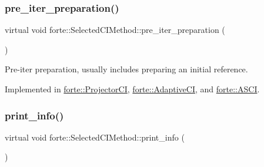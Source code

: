 \mbox{\label{classforte_1_1_selected_c_i_method_af92b210415034874fcf2faac8b00eca9}} 
\subsubsection{\texorpdfstring{pre\+\_\+iter\+\_\+preparation()}{pre\_iter\_preparation()}}
{\footnotesize\ttfamily virtual void forte\+::\+Selected\+C\+I\+Method\+::pre\+\_\+iter\+\_\+preparation (\begin{DoxyParamCaption}{ }\end{DoxyParamCaption})\hspace{0.3cm}{\ttfamily [pure virtual]}}



Pre-\/iter preparation, usually includes preparing an initial reference. 



Implemented in \mbox{\hyperlink{classforte_1_1_projector_c_i_a40fddd83a1450b2553f8347f82affca7}{forte\+::\+Projector\+CI}}, \mbox{\hyperlink{classforte_1_1_adaptive_c_i_afe7882564768985b90d3b3fd21c20a5f}{forte\+::\+Adaptive\+CI}}, and \mbox{\hyperlink{classforte_1_1_a_s_c_i_aff9c84376007b8ef5a54d90c3e6a1c52}{forte\+::\+A\+S\+CI}}.

\mbox{\label{classforte_1_1_selected_c_i_method_a95680d60059b29c763b5f87f9add48e2}} 
\subsubsection{\texorpdfstring{print\+\_\+info()}{print\_info()}}
{\footnotesize\ttfamily virtual void forte\+::\+Selected\+C\+I\+Method\+::print\+\_\+info (\begin{DoxyParamCaption}{ }\end{DoxyParamCaption})\hspace{0.3cm}{\ttfamily [pure virtual]}}



